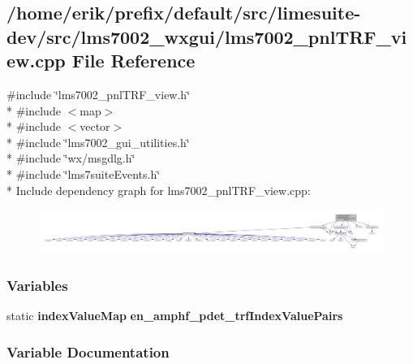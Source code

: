 \subsection{/home/erik/prefix/default/src/limesuite-\/dev/src/lms7002\+\_\+wxgui/lms7002\+\_\+pnl\+T\+R\+F\+\_\+view.cpp File Reference}
\label{lms7002__pnlTRF__view_8cpp}
{\ttfamily \#include \char`\"{}lms7002\+\_\+pnl\+T\+R\+F\+\_\+view.\+h\char`\"{}}\\*
{\ttfamily \#include $<$map$>$}\\*
{\ttfamily \#include $<$vector$>$}\\*
{\ttfamily \#include \char`\"{}lms7002\+\_\+gui\+\_\+utilities.\+h\char`\"{}}\\*
{\ttfamily \#include \char`\"{}wx/msgdlg.\+h\char`\"{}}\\*
{\ttfamily \#include \char`\"{}lms7suite\+Events.\+h\char`\"{}}\\*
Include dependency graph for lms7002\+\_\+pnl\+T\+R\+F\+\_\+view.\+cpp\+:
\nopagebreak
\begin{figure}[H]
\begin{center}
\leavevmode
\includegraphics[width=350pt]{d6/dce/lms7002__pnlTRF__view_8cpp__incl}
\end{center}
\end{figure}
\subsubsection*{Variables}
\begin{DoxyCompactItemize}
\item 
static {\bf index\+Value\+Map} {\bf en\+\_\+amphf\+\_\+pdet\+\_\+trf\+Index\+Value\+Pairs}
\end{DoxyCompactItemize}


\subsubsection{Variable Documentation}
